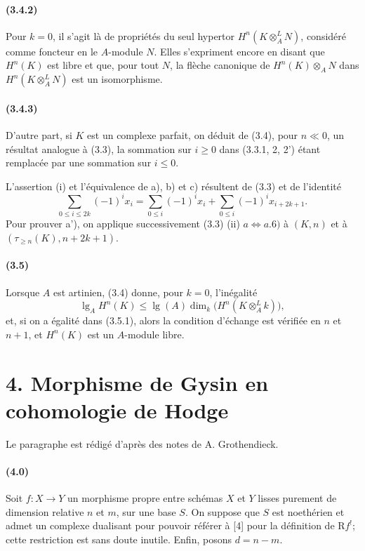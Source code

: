 \documentclass[10pt]{article}
\newcommand{\R}{\mathrm R}
\providecommand{\lgop}{\operatorname{lg}}
\begin{document}
\paragraph{(3.4.2)} Pour $k=0$, il s'agit là de propriétés du seul hypertor $H^n(K\otimes_A^L N)$, considéré comme foncteur en le $A$-module $N$. Elles s'expriment encore en disant que $H^n(K)$ est libre et que, pour tout $N$, la flèche canonique de $H^n(K)\otimes_A N$ dans $H^n(K\otimes_A^L N)$ est un isomorphisme.

\paragraph{(3.4.3)} D'autre part, si $K$ est un complexe parfait, on déduit de (3.4), pour $n\ll0$, un résultat analogue à (3.3), la sommation sur $i\ge0$ dans (3.3.1, 2, 2') étant remplacée par une sommation sur $i\le0$.

L'assertion (i) et l'équivalence de a), b) et c) résultent de (3.3) et de l'identité
\[
\sum_{0\le i\le 2k}(-1)^i x_i=
\sum_{0\le i}(-1)^i x_i+
\sum_{0\le i}(-1)^i x_{i+2k+1}.
\]
Pour prouver a'), on applique successivement (3.3) (ii) $a\Leftrightarrow a.6)$ à $(K,n)$ et à $(\tau_{\ge n}(K),n+2k+1)$.

\paragraph{(3.5)} Lorsque $A$ est artinien, (3.4) donne, pour $k=0$, l'inégalité
\[
\tag{3.5.1}
\lgop_A H^n(K)\le \lgop(A)\dim_k\bigl(H^n(K\otimes_A^L k)\bigr),
\]
et, si on a égalité dans (3.5.1), alors la condition d'échange est vérifiée en $n$ et $n+1$, et $H^n(K)$ est un $A$-module libre.

\section*{4. Morphisme de Gysin en cohomologie de Hodge}

Le paragraphe est rédigé d'après des notes de A. Grothendieck.

\paragraph{(4.0)} Soit $f:X\to Y$ un morphisme propre entre schémas $X$ et $Y$ lisses purement de dimension relative $n$ et $m$, sur une base $S$. On suppose que $S$ est noethérien et admet un complexe dualisant pour pouvoir référer à [4] pour la définition de $\R f^!$; cette restriction est sans doute inutile. Enfin, posons $d=n-m$.
\end{document}
